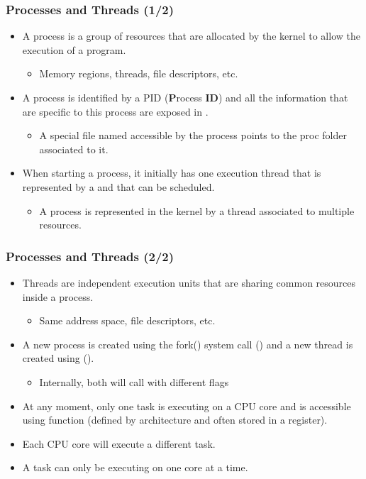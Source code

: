 \begin{frame}
  \frametitle{Processes and Threads (1/2)}
  \begin{itemize}
    \item A process is a group of resources that are allocated by the kernel
          to allow the execution of a program.
    \begin{itemize}
      \item Memory regions, threads, file descriptors, etc.
    \end{itemize}
    \item A process is identified by a PID ({\bf P}rocess {\bf ID}) and all the
          information that are specific to this process are exposed in
          .
    \begin{itemize}
      \item A special file named  accessible by the process
            points to the proc folder associated to it.
    \end{itemize}
    \item When starting a process, it initially has one execution thread that
          is represented by a  and that can be scheduled.
    \begin{itemize}
      \item A process is represented in the kernel by a thread associated to
            multiple resources.
    \end{itemize}
  \end{itemize}
\end{frame}

\begin{frame}
  \frametitle{Processes and Threads (2/2)}
  \begin{itemize}
    \item Threads are independent execution units that are sharing common
          resources inside a process.
    \begin{itemize}
      \item Same address space, file descriptors, etc.
    \end{itemize}
    \item A new process is created using the fork() system call
          () and a new thread is created using
           ().
    \begin{itemize}
      \item Internally, both will call  with different flags
    \end{itemize}
    \item At any moment, only one task is executing on a CPU core and is
          accessible using  function (defined by
          architecture and often stored in a register).
    \item Each CPU core will execute a different task.
    \item A task can only be executing on one core at a time.
  \end{itemize}
\end{frame}

